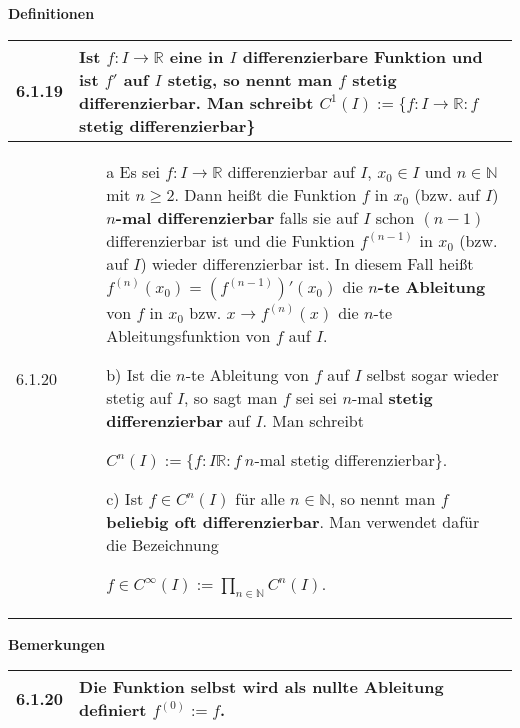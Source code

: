    \noindent
    \textbf{Definitionen}
    \begin{table}[H]  
    \begin{tabularx}{\textwidth}{X m{16cm}}
        \toprule

        6.1.19& Ist $f: I \rightarrow \mathbb{R}$ eine in $I$ differenzierbare Funktion und ist $f'$ auf $I$ stetig, so nennt man
                $f$ \textbf{stetig differenzierbar}. Man schreibt $C^1(I) := \{ f:I \rightarrow \mathbb{R}: f$ stetig differenzierbar\} \\
        \midrule
        6.1.20& \begin{itemize}[topsep=-0.5cm]
                    \item[a] Es sei $f: I \rightarrow \mathbb{R}$ differenzierbar auf $I$, $x_0 \in I$ und $n \in \mathbb{N}$ mit
                                $n \geq 2$. Dann heißt die Funktion $f$ in $x_0$ (bzw. auf $I$) \textbf{$n$-mal differenzierbar}
                                falls sie auf $I$ schon $(n-1)$ differenzierbar ist und die Funktion $f^{(n-1)}$ in $x_0$
                                (bzw. auf $I$) wieder differenzierbar ist. \hfill \break
                                In diesem Fall heißt $f^{(n)}(x_0) = (f^{(n-1)})'(x_0)$ die \textbf{$n$-te Ableitung} von $f$ in
                                $x_0$ bzw. $x \rightarrow f^{(n)}(x)$ die $n$-te Ableitungsfunktion von $f$ auf $I$. 
                    \item[b)] Ist die $n$-te Ableitung von $f$ auf $I$ selbst sogar wieder stetig auf $I$, so sagt man $f$ sei
                                sei $n$-mal \textbf{stetig differenzierbar} auf $I$. Man schreibt \hfill \break
                                \centerline{$ C^n(I) := \{ f: I \mathbb{R}: f~n$-mal stetig differenzierbar\}.}
                    \item[c)] Ist $f\in C^n(I)$ für alle $n \in \mathbb{N}$, so nennt man $f$ \textbf{beliebig oft differenzierbar}.
                                Man verwendet dafür die Bezeichnung \hfill \break
                                \centerline{$f \in C^{\infty}(I) := \prod_{n \in \mathbb{N}} C^n(I)$.}
                \end{itemize} \vspace{-0cm} \\

        \bottomrule

    \end{tabularx}
    \end{table}

    \noindent
    \textbf{Bemerkungen}
    \begin{table}[H]
    \begin{tabularx}{\textwidth}{X m{16cm}}
        \toprule

        6.1.20& Die Funktion selbst wird als nullte Ableitung definiert $f^{(0)} := f$. \\

        \bottomrule
    \end{tabularx}
    \end{table}


